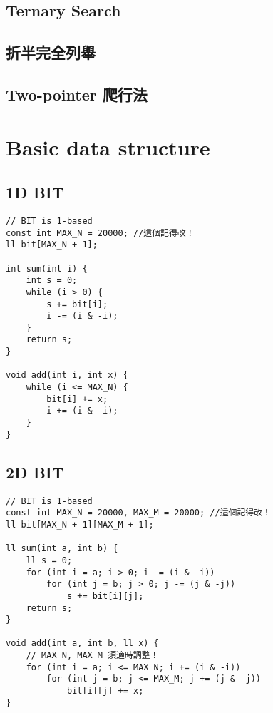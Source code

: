 \documentclass[10pt,oneside]{article}
\begin{document}
\begin{landscape}
\begin{multicols}{2}
\subsection{Ternary Search}

\subsection{折半完全列舉}

\subsection{Two-pointer 爬行法}


\section{Basic data structure}

\subsection{1D BIT}

\begin{lstlisting}
// BIT is 1-based
const int MAX_N = 20000; //這個記得改！
ll bit[MAX_N + 1];

int sum(int i) {
    int s = 0;
    while (i > 0) {
        s += bit[i];
        i -= (i & -i);
    }
    return s;
}

void add(int i, int x) {
    while (i <= MAX_N) {
        bit[i] += x;
        i += (i & -i);
    }
}
\end{lstlisting}

\subsection{2D BIT}

\begin{lstlisting}
// BIT is 1-based
const int MAX_N = 20000, MAX_M = 20000; //這個記得改！
ll bit[MAX_N + 1][MAX_M + 1];

ll sum(int a, int b) {
    ll s = 0;
    for (int i = a; i > 0; i -= (i & -i))
        for (int j = b; j > 0; j -= (j & -j))
            s += bit[i][j];
    return s;
}

void add(int a, int b, ll x) {
	// MAX_N, MAX_M 須適時調整！
    for (int i = a; i <= MAX_N; i += (i & -i))
        for (int j = b; j <= MAX_M; j += (j & -j))
            bit[i][j] += x;
}
\end{lstlisting}


\end{multicols}
\end{landscape}
\end{document}
